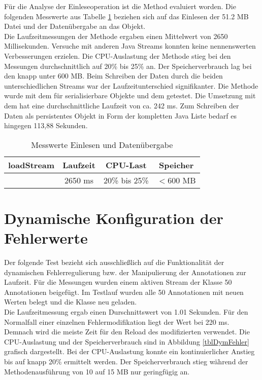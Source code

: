 F\"ur die Analyse der Einleseoperation ist die Method  evaluiert worden. Die folgenden Messwerte aus Tabelle \ref{tblEinlesen} beziehen sich auf das Einlesen der 51.2 MB Datei und der Daten\"ubergabe an das  Objekt.\\
Die Laufzeitmessungen der Methode  ergaben einen Mittelwert von 2650 Millisekunden. Versuche mit anderen Java Streams konnten keine nennenswerten Verbesserungen erzielen. Die CPU-Auslastung der Methode stieg bei den Messungen durchschnittlich auf 20\% bis 25\% an. Der Speicherverbrauch lag bei den knapp unter 600 MB. Beim Schreiben der Daten durch die beiden unterschiedlichen Streams war der Laufzeitunterschied signifikanter. Die  Methode wurde mit dem  f\"ur serialisierbare Objekte und dem  getestet. Die Umsetzung mit dem  hat eine durchschnittliche Laufzeit von ca. 242 ms. Zum Schreiben der Daten als persistentes Objekt in Form der kompletten Java Liste bedarf es hingegen 113,88 Sekunden.\\

\begin{table}[!htbp]
\centering
\begin{tabular}{c|c|c|c|}
loadStream & Laufzeit & CPU-Last & Speicher\\
\hline
& 2650 ms & 20\% bis 25\% & $<$600 MB\\
\end{tabular}
\caption{Messwerte Einlesen und Daten\"ubergabe}
\label{tblEinlesen}
\end{table}

\section{Dynamische Konfiguration der Fehlerwerte}

Der folgende Test bezieht sich ausschlie\ss lich auf die Funktionalit\"at der dynamischen Fehlerregulierung bzw. der Manipulierung der Annotationen zur Laufzeit. F\"ur die Messungen wurden einem aktiven Stream der Klasse  50  Annotationen beigef\"ugt. Im Testlauf wurden alle 50 Annotationen mit neuen Werten belegt und die Klasse  neu geladen.\\
Die Laufzeitmessung ergab einen Durschnittswert von 1.01 Sekunden. F\"ur den Normalfall einer einzelnen Fehlermodifikation liegt der Wert bei 220 ms. Demnach wird die meiste Zeit f\"ur den Reload des modifizierten  verwendet. Die CPU-Auslastung und der Speicherverbrauch sind in Abbildung \ref{tblDymFehler} grafisch dargestellt. Bei der CPU-Auslastung konnte ein kontinuierlicher Anstieg bis auf knapp 20\% ermittelt werden. Der Speicherverbrauch stieg w\"ahrend der Methodenausf\"uhrung von 10 auf 15 MB nur geringf\"ugig an. 

